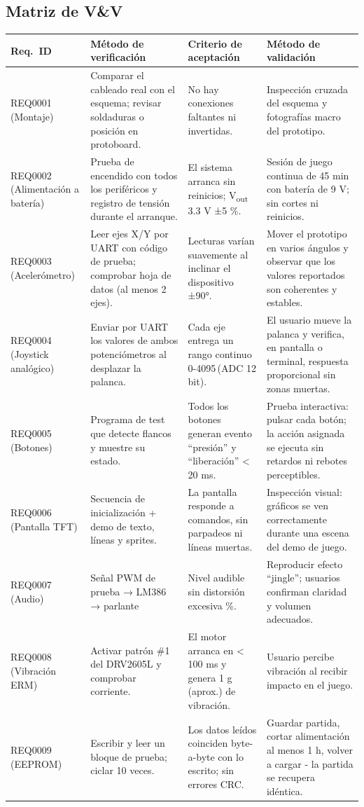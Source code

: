 \documentclass[11pt,a4paper]{article}
\begin{document}
\subsection{Matriz de V\&V}
\begin{longtable}{|p{2cm}|p{5.3cm}|p{4.7cm}|p{4.7cm}|}
\hline
\rowcolor[HTML]{C0C0C0}
\textbf{Req.\ ID} &
\textbf{Método de verificación} &
\textbf{Criterio de aceptación} &
\textbf{Método de validación} \\ \hline
REQ0001 (Montaje) &
Comparar el cableado real con el esquema; revisar soldaduras
o posición en protoboard. &
No hay conexiones faltantes ni invertidas. &
Inspección cruzada del esquema y fotografías macro del
prototipo. \\ \hline
REQ0002 (Alimentación a batería) &
Prueba de encendido con todos los
periféricos y registro de tensión durante
el arranque. &
El sistema arranca sin reinicios; V\textsubscript{out}
3.3 V ±5 \%. &
Sesión de juego continua de
45 min con batería de 9 V;
sin cortes ni reinicios. \\ \hline
REQ0003 (Acelerómetro) &
Leer ejes X/Y por UART con código de prueba;
comprobar hoja de datos (al menos 2 ejes). &
Lecturas varían suavemente al inclinar
el dispositivo ±90°. &
Mover el prototipo en varios
ángulos y observar que los
valores reportados son coherentes y estables. \\ \hline
REQ0004 (Joystick analógico) &
Enviar por UART los valores de ambos
potenciómetros al desplazar la palanca. &
Cada eje entrega un rango continuo
0-4095\,(ADC 12 bit). &
El usuario mueve la palanca y
verifica, en pantalla o terminal,
respuesta proporcional sin zonas muertas. \\ \hline
REQ0005 (Botones) &
Programa de test que detecte flancos
y muestre su estado. &
Todos los botones generan evento
“presión” y “liberación” < 20 ms. &
Prueba interactiva: pulsar
cada botón; la acción asignada
se ejecuta sin retardos ni rebotes
perceptibles. \\ \hline
REQ0006 (Pantalla TFT) &
Secuencia de inicialización + demo
de texto, líneas y sprites. &
La pantalla responde a comandos,
sin parpadeos ni líneas muertas. &
Inspección visual: gráficos se ven
correctamente durante una escena del
demo de juego. \\ \hline
REQ0007 (Audio) &
Señal PWM de prueba → LM386 →
parlante &
Nivel audible sin distorsión
excesiva \%. &
Reproducir efecto “jingle”;
usuarios confirman claridad y volumen adecuados. \\ \hline
REQ0008 (Vibración ERM) &
Activar patrón \#1 del DRV2605L
y comprobar corriente. &
El motor arranca en < 100 ms y
genera 1 g (aprox.) de vibración. &
Usuario percibe vibración al
recibir impacto en el juego. \\ \hline
REQ0009 (EEPROM) &
Escribir y leer un bloque de prueba;
ciclar 10 veces. &
Los datos leídos coinciden byte-a-byte
con lo escrito; sin errores CRC. &
Guardar partida, cortar
alimentación al menos 1 h, volver a
cargar - la partida se recupera idéntica. \\ \hline
\end{longtable}
\end{document}
